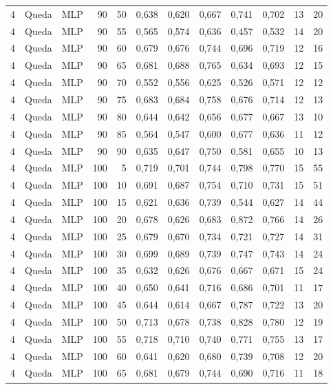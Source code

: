 \begin{longtable}{@{}rllrrrrrrrrr@{}}
4 & Queda & MLP & 90 & 50 & 0,638 & 0,620 & 0,667 & 0,741 & 0,702 & 13 & 20 \\
4 & Queda & MLP & 90 & 55 & 0,565 & 0,574 & 0,636 & 0,457 & 0,532 & 14 & 20 \\
4 & Queda & MLP & 90 & 60 & 0,679 & 0,676 & 0,744 & 0,696 & 0,719 & 12 & 16 \\
4 & Queda & MLP & 90 & 65 & 0,681 & 0,688 & 0,765 & 0,634 & 0,693 & 12 & 15 \\
4 & Queda & MLP & 90 & 70 & 0,552 & 0,556 & 0,625 & 0,526 & 0,571 & 12 & 12 \\
4 & Queda & MLP & 90 & 75 & 0,683 & 0,684 & 0,758 & 0,676 & 0,714 & 12 & 13 \\
4 & Queda & MLP & 90 & 80 & 0,644 & 0,642 & 0,656 & 0,677 & 0,667 & 13 & 10 \\
4 & Queda & MLP & 90 & 85 & 0,564 & 0,547 & 0,600 & 0,677 & 0,636 & 11 & 12 \\
4 & Queda & MLP & 90 & 90 & 0,635 & 0,647 & 0,750 & 0,581 & 0,655 & 10 & 13 \\
4 & Queda & MLP & 100 & 5 & 0,719 & 0,701 & 0,744 & 0,798 & 0,770 & 15 & 55 \\
4 & Queda & MLP & 100 & 10 & 0,691 & 0,687 & 0,754 & 0,710 & 0,731 & 15 & 51 \\
4 & Queda & MLP & 100 & 15 & 0,621 & 0,636 & 0,739 & 0,544 & 0,627 & 14 & 44 \\
4 & Queda & MLP & 100 & 20 & 0,678 & 0,626 & 0,683 & 0,872 & 0,766 & 14 & 26 \\
4 & Queda & MLP & 100 & 25 & 0,679 & 0,670 & 0,734 & 0,721 & 0,727 & 14 & 31 \\
4 & Queda & MLP & 100 & 30 & 0,699 & 0,689 & 0,739 & 0,747 & 0,743 & 14 & 24 \\
4 & Queda & MLP & 100 & 35 & 0,632 & 0,626 & 0,676 & 0,667 & 0,671 & 15 & 24 \\
4 & Queda & MLP & 100 & 40 & 0,650 & 0,641 & 0,716 & 0,686 & 0,701 & 11 & 17 \\
4 & Queda & MLP & 100 & 45 & 0,644 & 0,614 & 0,667 & 0,787 & 0,722 & 13 & 20 \\
4 & Queda & MLP & 100 & 50 & 0,713 & 0,678 & 0,738 & 0,828 & 0,780 & 12 & 19 \\
4 & Queda & MLP & 100 & 55 & 0,718 & 0,710 & 0,740 & 0,771 & 0,755 & 13 & 17 \\
4 & Queda & MLP & 100 & 60 & 0,641 & 0,620 & 0,680 & 0,739 & 0,708 & 12 & 20 \\
4 & Queda & MLP & 100 & 65 & 0,681 & 0,679 & 0,744 & 0,690 & 0,716 & 11 & 18 \\

\end{longtable}
